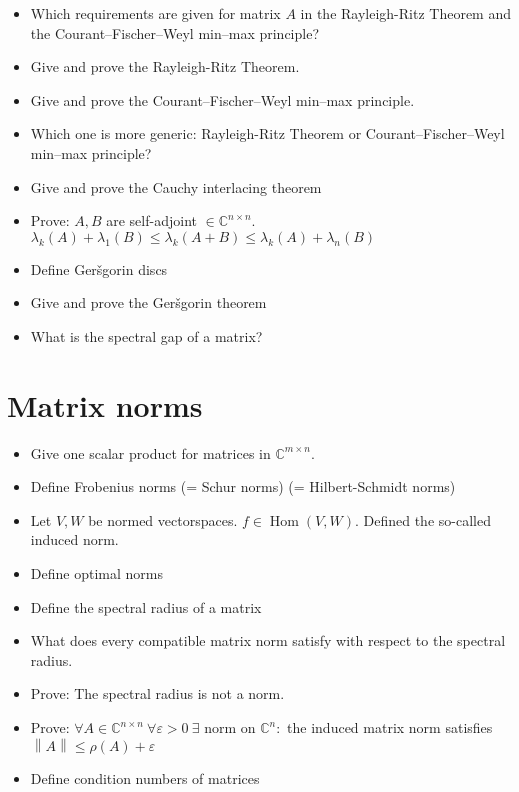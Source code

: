 \documentclass[a4paper]{article}
\newcommand{\norm}[1]{\left\|#1\right\|}
\begin{document}
\begin{itemize}
  \item Which requirements are given for matrix $A$ in the Rayleigh-Ritz Theorem and the Courant--Fischer--Weyl min--max principle?
  \item Give and prove the Rayleigh-Ritz Theorem.
  \item Give and prove the Courant--Fischer--Weyl min--max principle.
  \item Which one is more generic: Rayleigh-Ritz Theorem or Courant--Fischer--Weyl min--max principle?
  \item Give and prove the Cauchy interlacing theorem
  \item Prove: $A, B$ are self-adjoint $\in \mathbb C^{n \times n}$. $\lambda_{k}(A) + \lambda_1(B) \leq \lambda_k(A + B) \leq \lambda_k(A) + \lambda_n(B)$
  \item Define Ger\v{s}gorin discs
  \item Give and prove the Ger\v{s}gorin theorem
  \item What is the spectral gap of a matrix?
\end{itemize}

\section{Matrix norms}

\begin{itemize}
  \item Give one scalar product for matrices in $\mathbb C^{m \times n}$.
  \item Define Frobenius norms (= Schur norms) (= Hilbert-Schmidt norms)
  \item Let $V, W$ be normed vectorspaces. $f \in \operatorname{Hom}(V, W)$. Defined the so-called induced norm.
  \item Define optimal norms
  \item Define the spectral radius of a matrix
  \item What does every compatible matrix norm satisfy with respect to the spectral radius.
  \item Prove: The spectral radius is not a norm.
  \item Prove: $\forall A \in \mathbb C^{n \times n} \: \forall \varepsilon > 0 \:\exists \text{ norm on } \mathbb C^n:$ the induced matrix norm satisfies $\norm{A} \leq \rho(A) + \varepsilon$
  \item Define condition numbers of matrices
\end{itemize}
\end{document}
